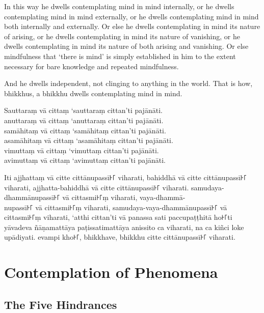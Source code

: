 In this way he dwells contemplating mind in mind internally, or he dwells
contemplating mind in mind externally, or he dwells contemplating mind in mind
both internally and externally. Or else he dwells contemplating in mind its
nature of arising, or he dwells contemplating in mind its nature of vanishing,
or he dwells contemplating in mind its nature of both arising and vanishing. Or
else mindfulness that ‘there is mind’ is simply established in him to the extent
necessary for bare knowledge and repeated mindfulness.

And he dwells independent, not clinging to anything in the world. That is how,
bhikkhus, a bhikkhu dwells contemplating mind in mind.


\paliPage

Sauttaraṃ vā cittaṃ ‘sauttaraṃ cittan’ti pajānāti.\\
anuttaraṃ vā cittaṃ ‘anuttaraṃ cittan’ti pajānāti.\\
samāhitaṃ vā cittaṃ ‘samāhitaṃ cittan’ti pajānāti.\\
asamāhitaṃ vā cittaṃ ‘asamāhitaṃ cittan’ti pajānāti.\\
vimuttaṃ vā cittaṃ ‘vimuttaṃ cittan’ti pajānāti.\\
avimuttaṃ vā cittaṃ ‘avimuttaṃ cittan’ti pajānāti.

Iti ajjhattaṃ vā citte cittānupassī꜔꜒ viharati, bahiddhā vā citte cittānupassī꜔꜒
viharati, ajjhatta-bahiddhā vā citte cittānupassī꜔꜒ viharati.
samudaya-dhammānupassī꜔꜒ vā cittasmi꜔꜒ṃ viharati, vaya-dhammā-\\
nupassī꜔꜒ vā cittasmi꜔꜒ṃ viharati, samudaya-vaya-dhammānupassī꜔꜒ vā cittasmi꜔꜒ṃ
viharati, ‘atthi cittan’ti vā panassa sati paccupaṭṭhitā ho꜔꜒ti yāvadeva
ñāṇamattāya paṭissatimattāya anissito ca viharati, na ca kiñci loke upādiyati.
evampi kho꜔꜒, bhikkhave, bhikkhu citte cittānupassī꜔꜒ viharati.


\englishPage

\paliPage

\englishPage
\chapter{Contemplation of Phenomena}

\section{The Five Hindrances}

